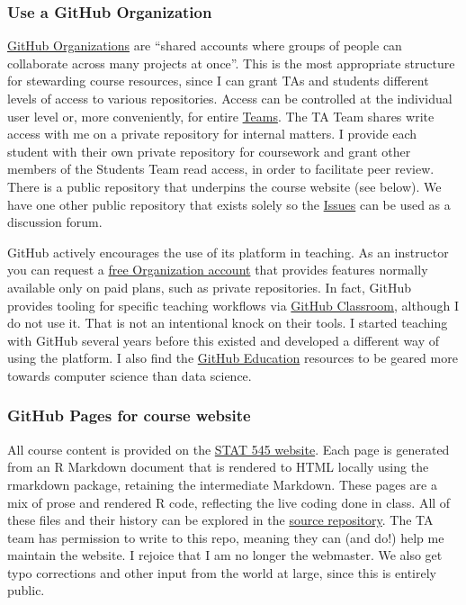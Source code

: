 \documentclass[12pt]{article}
\begin{document}
\subsubsection{Use a GitHub
Organization}\label{use-a-github-organization}

\href{https://help.github.com/articles/differences-between-user-and-organization-accounts/}{GitHub
Organizations} are ``shared accounts where groups of people can
collaborate across many projects at once''. This is the most appropriate
structure for stewarding course resources, since I can grant TAs and
students different levels of access to various repositories. Access can
be controlled at the individual user level or, more conveniently, for
entire \href{https://help.github.com/articles/setting-up-teams/}{Teams}.
The TA Team shares write access with me on a private repository for
internal matters. I provide each student with their own private
repository for coursework and grant other members of the Students Team
read access, in order to facilitate peer review. There is a public
repository that underpins the course website (see below). We have one
other public repository that exists solely so the
\href{https://github.com/STAT545-UBC/Discussion/issues}{Issues} can be
used as a discussion forum.

GitHub actively encourages the use of its platform in teaching. As an
instructor you can request a
\href{https://help.github.com/articles/discounted-organization-accounts/}{free
Organization account} that provides features normally available only on
paid plans, such as private repositories. In fact, GitHub provides
tooling for specific teaching workflows via
\href{https://classroom.github.com/}{GitHub Classroom}, although I do
not use it. That is not an intentional knock on their tools. I started
teaching with GitHub several years before this existed and developed a
different way of using the platform. I also find the
\href{https://education.github.com}{GitHub Education} resources to be
geared more towards computer science than data science.

\subsubsection{GitHub Pages for course
website}\label{github-pages-for-course-website}

All course content is provided on the \href{http://stat545.com}{STAT 545
website}. Each page is generated from an R Markdown document that is
rendered to HTML locally using the rmarkdown package, retaining the
intermediate Markdown. These pages are a mix of prose and rendered R
code, reflecting the live coding done in class. All of these files and
their history can be explored in the
\href{https://github.com/STAT545-UBC/STAT545-UBC.github.io}{source
repository}. The TA team has permission to write to this repo, meaning
they can (and do!) help me maintain the website. I rejoice that I am no
longer the webmaster. We also get typo corrections and other input from
the world at large, since this is entirely public.
\end{document}
